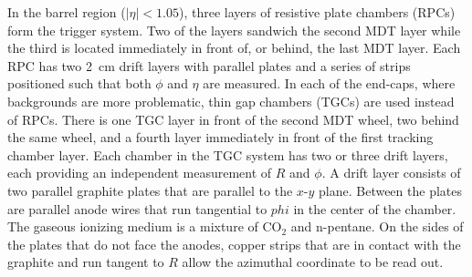 In the barrel region ($|\eta| < 1.05$), three layers of resistive
plate chambers (RPCs) form the trigger system. Two of the layers
sandwich the second MDT layer while the third is located immediately
in front of, or behind, the last MDT layer. Each RPC has two 2~cm drift layers with
parallel plates and a series of strips positioned such that both
$\phi$ and $\eta$ are measured. In each of the end-caps, where
backgrounds are more problematic, thin gap chambers (TGCs) are used
instead of RPCs. There is one TGC layer in front of the second MDT
wheel, two behind the same wheel, and a fourth layer immediately in
front of the first tracking chamber layer. Each chamber in the TGC
system has two or three drift layers, each providing an independent
measurement of $R$ and $\phi$. A drift layer consists of two parallel
graphite plates that are parallel to the $x$-$y$ plane. Between the
plates are parallel anode wires that run tangential to $phi$ in the
center of the chamber. The gaseous ionizing medium is a mixture of CO$_2$ and
n-pentane. On the sides of the plates that do not face the anodes,
copper strips that are in contact with the graphite and run tangent to
$R$ allow the azimuthal coordinate to be read out. 
